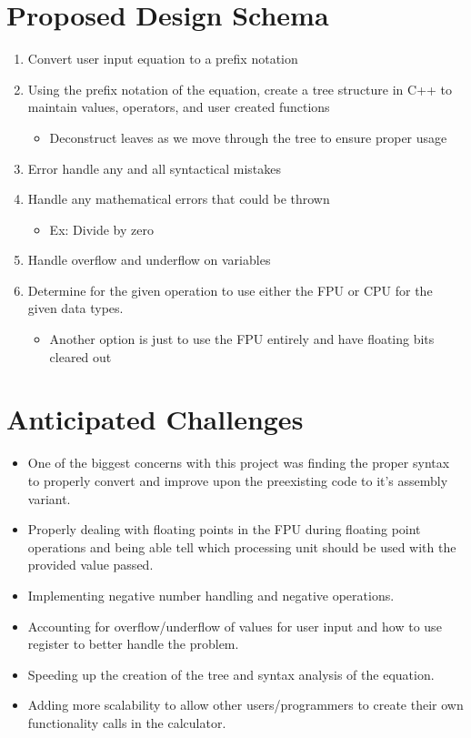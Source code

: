 \documentclass[a4paper,10pt]{article}
\begin{document}
\section*{Proposed Design Schema}
\begin{enumerate}
  \item Convert user input equation to a prefix notation 
  \item Using the prefix notation of the equation, create a tree structure in C++ to maintain values, operators, and user created functions
  \begin{itemize}
      \item Deconstruct leaves as we move through the tree to ensure proper usage
  \end{itemize}
  \item Error handle any and all syntactical mistakes
  \item Handle any mathematical errors that could be thrown
  \begin{itemize}
      \item Ex: Divide by zero
  \end{itemize}
  \item Handle overflow and underflow on variables
  \item Determine for the given operation to use either the FPU or CPU for the given data types. 
  \begin{itemize}
      \item Another option is just to use the FPU entirely and have floating bits cleared out 
  \end{itemize}
\end{enumerate}




\section*{Anticipated Challenges}

\begin{itemize}
  \item One of the biggest concerns with this project was finding the proper syntax to properly convert and improve upon the preexisting code to it’s assembly variant. 
  \item Properly dealing with floating points in the FPU during floating point operations and being able tell which processing unit should be used with the provided value passed.
  \item Implementing negative number handling and negative operations.
  \item Accounting for overflow/underflow of values for user input and how to use register to better handle the problem. 
  \item Speeding up the creation of the tree and syntax analysis of the equation.
  \item Adding more scalability to allow other users/programmers to create their own functionality calls in the calculator.
\end{itemize}
\end{document}
